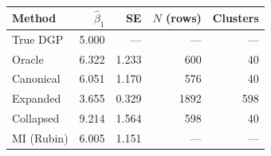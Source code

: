 \begin{tabular}{lrrrr}
\toprule
Method & $\hat\beta_1$ & SE & $N$ (rows) & Clusters \\
\midrule
True DGP & 5.000 & --- & --- & --- \\
Oracle & 6.322 & 1.233 & 600 & 40 \\
Canonical & 6.051 & 1.170 & 576 & 40 \\
Expanded & 3.655 & 0.329 & 1892 & 598 \\
Collapsed & 9.214 & 1.564 & 598 & 40 \\
MI (Rubin) & 6.005 & 1.151 & --- & --- \\
\bottomrule
\end{tabular}
